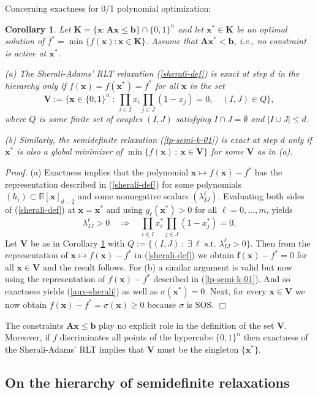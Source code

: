 \documentclass[11pt]{article}
\newtheorem{cor}{Corollary}[section]
\numberwithin{equation}{section}
\def\x{\mathbf{x}}
\def\R{\mathbb{R}}
\def\K{\mathbf{K}}
\def\A{\mathbf{A}}
\def\V{\mathbf{V}}
\def\f{\mathbf{f}}
\def\b{\mathcal{B}}
\def\b{\mathbf{b}}
\begin{document}
Concerning exactness for 0/1 polynomial optimization:
\begin{cor}
\label{sherali-exact}
Let $\K=\{\x:\A\x\leq\b\}\cap\{0,1\}^n$ and let
$\x^*\in\K$ be an optimal solution of $f^*=\min \{f(\x):\x\in\K\}$.
Assume that $\A\x^*<\b$, i.e., no constraint is active at $\x^*$. 

(a) The Sherali-Adams' RLT relaxation (\ref{sherali-def}) is exact at step
$d$ in the hierarchy only if $f(\x)=f(\x^*)=f^*$ for all
$\x$ in the set
\[\V:=\{\x\in\{0,1\}^n\::\:\prod_{i\in I}x_i\prod_{j\in J}(1-x_j)=0,\quad (I,J)\in Q\},\]
where $Q$ is some finite set of couples $(I,J)$ satisfying
$I\cap J=\emptyset$ and $\vert I\cup J\vert\leq d$. 

(b)  Similarly, the semidefinite relaxation (\ref{lp-semi-k-01}) is exact at step $d$ only if 
$\x^*$ is also a global minimizer of $\min \{f(\x)\,:\:\x\in\V\}$ for some $\V$
as in (a).
\end{cor}
{\it Proof.}
(a) Exactness implies that the polynomial $\x\mapsto f(\x)-f^*$ has 
the representation described in (\ref{sherali-def}) for some polynomials $(h_i)\subset\R[\x]_{d-2}$ and some nonnegative scalars 
$(\lambda^\ell_{IJ})$.
Evaluating both sides of (\ref{sherali-def}) at $\x=\x^*$ and using $g_\ell(\x^*)>0$ for all $\ell=0,\ldots,m$, yields
\begin{equation}
\label{aux-sherali}
\lambda_{IJ}^\ell>0\quad\Longrightarrow\quad\prod_{i\in I}x^*_i\prod_{j\in J}(1-x^*_j)=0.\end{equation}
Let $\V$ be as in Corollary \ref{sherali-exact} with $Q:=\{(I,J)\::\:\mbox{$\exists\,\ell$ s.t. }\lambda^\ell_{IJ}>0\}$. Then
from the representation of $\x\mapsto f(\x)-f^*$ in (\ref{sherali-def}) we obtain
$\f(\x)-f^*=0$ for all $\x\in\V$ and the result follows. For (b) a similar argument is valid but now using the representation
of $f(\x)-f^*$ described in (\ref{lp-semi-k-01}). And so exactness yields (\ref{aux-sherali}) as well as
 $\sigma(\x^*)=0$. Next, for every $\x\in \V$ we now obtain $f(\x)-f^*=\sigma(\x)\geq0$ because $\sigma$ is SOS.
$\Box$
\vspace{0.2cm}

The constraints $\A\x\leq\b$ play no explicit role in the definition
of the set $\V$. Moreover, if $f$ discriminates all points of the hypercube $\{0,1\}^n$
then exactness of the Sherali-Adams' RLT
implies that $\V$ must be the singleton $\{\x^*\}$.


\subsection*{On the hierarchy of semidefinite relaxations} 
\end{document}
